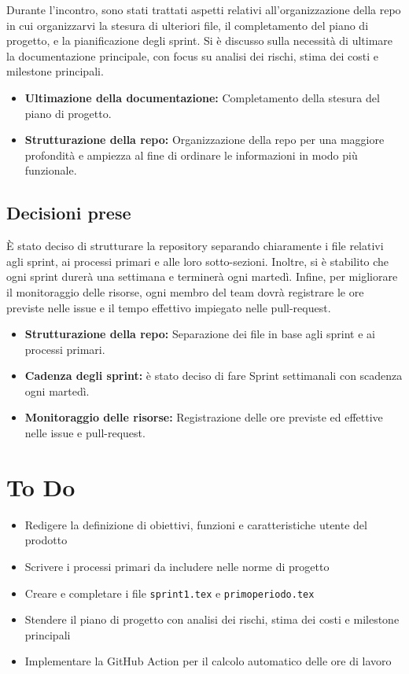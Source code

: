 \documentclass[a4paper, 12pt]{article}
\begin{document}
Durante l'incontro, sono stati trattati aspetti relativi all'organizzazione della repo in cui organizzarvi la stesura di ulteriori file, il completamento del piano di progetto, e la pianificazione degli sprint. Si è discusso sulla necessità di ultimare la documentazione principale, con focus su analisi dei rischi, stima dei costi e milestone principali.

\begin{itemize}
    \item \textbf{Ultimazione della documentazione:} Completamento della stesura del piano di progetto.
    \item \textbf{Strutturazione della repo:} Organizzazione della repo per una maggiore profondità e ampiezza al fine di ordinare le informazioni in modo più funzionale.
\end{itemize}

\subsection{Decisioni prese}

È stato deciso di strutturare la repository separando chiaramente i file relativi agli sprint, ai processi primari e alle loro sotto-sezioni. Inoltre, si è stabilito che ogni sprint durerà una settimana e terminerà ogni martedì. Infine, per migliorare il monitoraggio delle risorse, ogni membro del team dovrà registrare le ore previste nelle issue e il tempo effettivo impiegato nelle pull-request.

\begin{itemize}
    \item \textbf{Strutturazione della repo:} Separazione dei file in base agli sprint e ai processi primari.
    \item \textbf{Cadenza degli sprint:} è stato deciso di fare Sprint settimanali con scadenza ogni martedì.
    \item \textbf{Monitoraggio delle risorse:} Registrazione delle ore previste ed effettive nelle issue e pull-request.
\end{itemize}

\section{To Do}
\begin{itemize}
    \item Redigere la definizione di obiettivi, funzioni e caratteristiche utente del prodotto
    \item Scrivere i processi primari da includere nelle norme di progetto
    \item Creare e completare i file \texttt{sprint1.tex} e \texttt{primoperiodo.tex}
    \item Stendere il piano di progetto con analisi dei rischi, stima dei costi e milestone principali
    \item Implementare la GitHub Action per il calcolo automatico delle ore di lavoro
\end{itemize}
\end{document}
